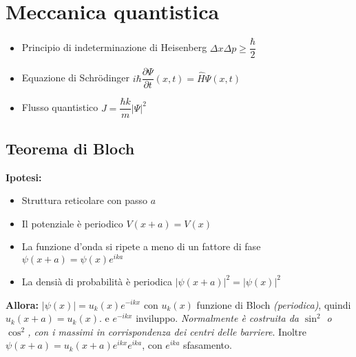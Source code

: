 \documentclass{article}
\begin{document}
\section{Meccanica quantistica}
\begin{itemize}
  \item Principio di indeterminazione di Heisenberg \( \Delta x \Delta p \geq \dfrac{\hbar}{2} \)
  \item Equazione di Schrödinger \( i \hbar \dfrac{\partial \Psi}{\partial t} (x, t) = \hat{H} \Psi (x,t) \)
  \item Flusso quantistico \( J = \dfrac{\hbar k}{m} \left| \Psi \right| ^ 2 \)
\end{itemize}

\subsection{Teorema di Bloch}
\textbf{Ipotesi:}
\begin{itemize}
  \item Struttura reticolare con passo \( a \)
  \item Il potenziale è periodico \( V(x+a) = V(x) \)
  \item La funzione d'onda si ripete a meno di un fattore di fase \( \psi(x+a) = \psi(x) e^{ i k  a} \)
  \item La densià di probabilità è periodica \( \left| \psi(x+a) \right|^2 = \left| \psi(x)  \right|^2 \)
\end{itemize}
\textbf{Allora:} \( \left| \psi(x) \right| = u_k(x) e^{ -ikx } \) con \( u_k(x) \) funzione di Bloch \textit{(periodica)}, quindi \( u_k (x+a) = u_k(x).\) e \( e^{ -ikx } \) inviluppo. \newline \textit{Normalmente è costruita da \(\sin^2\) o \(\cos^2\), con i massimi in corrispondenza dei centri delle barriere}. \newline
Inoltre \( \psi(x+a) = u_k (x+a) e^{ikx} e^{ika} \), con \( e^{ika} \) sfasamento.
\end{document}
